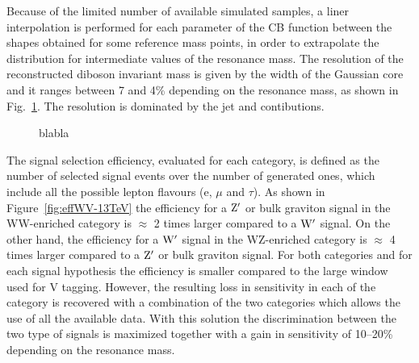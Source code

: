 Because of the limited number of available simulated samples, a liner interpolation is performed for each parameter of the CB function between
the shapes obtained for some reference mass points, in order to extrapolate the distribution for intermediate values of the resonance mass.
The resolution of the reconstructed diboson invariant mass is given by the width of the Gaussian core and it ranges between 7 and 4\% depending on the resonance mass, as shown in Fig.~\ref{fig:relCB}.
The resolution is dominated by the jet and \ETmiss contibutions.

\begin{figure}[!htb]
\centering
{}
\caption{blabla}
\label{fig:relCB}
\end{figure}

The signal selection efficiency, evaluated for each category, is defined as the number of selected signal events over the number of generated ones, which include all the possible lepton flavours (e, $\mu$ and $\tau$).
As shown in Figure~\ref{fig:effWV-13TeV} the efficiency for a $\mathrm{Z}^\prime$ or bulk graviton signal in the WW-enriched category is $\approx$ 2 times larger compared to a $\mathrm{W}^\prime$ signal. On the other hand, the efficiency for a $\mathrm{W}^\prime$ signal in the WZ-enriched category is $\approx$ 4 times larger compared to a $\mathrm{Z}^\prime$ or bulk graviton signal. For both categories and for each signal hypothesis the efficiency is smaller compared to the large \mJ window used for V tagging. However, the resulting loss in sensitivity in each of the category is recovered with a combination of the two \mJ categories which allows the use of all the available data. With this solution the discrimination between the two type of signals is maximized together with a gain in sensitivity of 10--20\% depending on the resonance mass.

